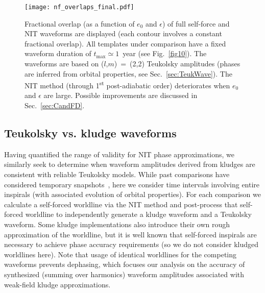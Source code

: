 \documentclass[aps,prd,twocolumn,showpacs,notitlepage,eqsecnum,
superscriptaddress,nofootinbib]{revtex4-1}
\begin{document}
\begin{figure}
\centering
  \vspace{0.2cm}
  \texttt{[image: nf\_overlaps\_final.pdf]} 
    \caption{Fractional overlap (as a function of $e_0$ and $\epsilon$) of full self-force and NIT waveforms are displayed (each contour involves a constant fractional overlap). All templates under comparison have a fixed waveform duration of $t_\text{max}\simeq 1$~year (see Fig.~\ref{fig10}). The waveforms are based on ($l$,$m$)~=~(2,2) Teukolsky amplitudes (phases are inferred from orbital properties, see Sec.~\ref{sec:TeukWave}). The NIT method (through 1\textsuperscript{st} post-adiabatic order) deteriorates when $e_0$ and $\epsilon$ are large. Possible improvements are discussed in Sec.~\ref{sec:CandFD}.} 
  \label{fig11}
\end{figure}

\subsection{Teukolsky vs. kludge waveforms}
\label{sec:TeukVsKludge}

Having quantified the range of validity for NIT phase approximations, we similarly seek to determine when waveform amplitudes derived from kludges are consistent with reliable Teukolsky models. While past comparisons have considered temporary snapshots~\cite{Babak_2007}, here we consider time intervals involving entire inspirals (with associated evolution of orbital properties). For each comparison we calculate a self-forced worldline via the NIT method and post-process that self-forced worldline to independently generate a kludge waveform and a Teukolsky waveform. Some kludge implementations also introduce their own rough approximation of the worldline, but it is well known that self-forced inspirals are necessary to achieve phase accuracy requirements (so we do not consider kludged worldlines here). Note that usage of identical worldlines for the competing waveforms prevents dephasing, which focuses our analysis on the accuracy of synthesized (summing over harmonics) waveform amplitudes associated with weak-field kludge approximations.
\end{document}
